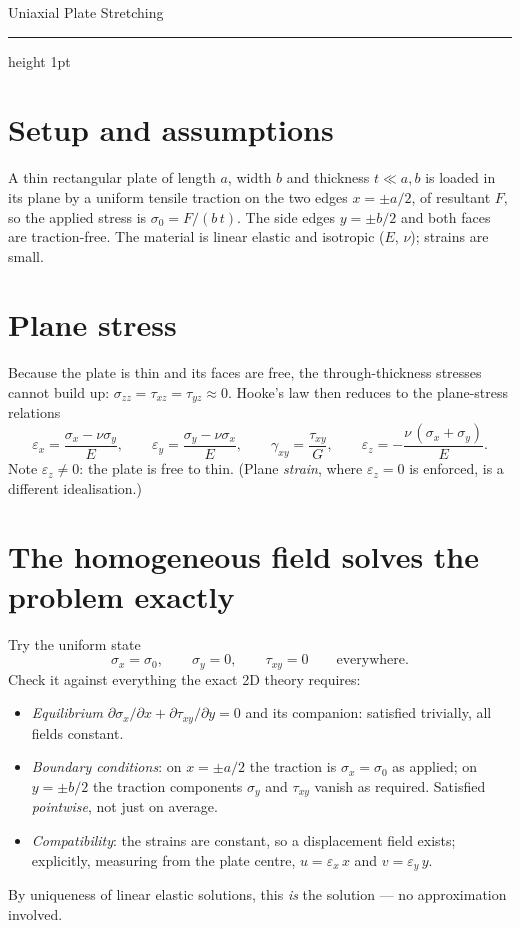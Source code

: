 \documentclass[10pt,a4paper]{article}
\begin{document}
{\LARGE Uniaxial Plate Stretching}

\medskip
{\color{celline}\hrule height 1pt}

\section*{Setup and assumptions}
A thin rectangular plate of length $a$, width $b$ and thickness $t \ll a, b$ is
loaded in its plane by a uniform tensile traction on the two edges
$x = \pm a/2$, of resultant $F$, so the applied stress is
$\sigma_0 = F/(b\,t)$. The side edges $y = \pm b/2$ and both faces are
traction-free. The material is linear elastic and isotropic ($E$, $\nu$);
strains are small.

\section*{Plane stress}
Because the plate is thin and its faces are free, the through-thickness stresses
cannot build up: $\sigma_{zz} = \tau_{xz} = \tau_{yz} \approx 0$. Hooke's law
then reduces to the plane-stress relations
\begin{equation}
\varepsilon_x = \frac{\sigma_x - \nu \sigma_y}{E}, \qquad
\varepsilon_y = \frac{\sigma_y - \nu \sigma_x}{E}, \qquad
\gamma_{xy} = \frac{\tau_{xy}}{G}, \qquad
\varepsilon_z = -\frac{\nu\,(\sigma_x + \sigma_y)}{E}.
\end{equation}
Note $\varepsilon_z \neq 0$: the plate is free to thin. (Plane \emph{strain},
where $\varepsilon_z = 0$ is enforced, is a different idealisation.)

\section*{The homogeneous field solves the problem exactly}
Try the uniform state
\begin{equation}
\sigma_x = \sigma_0, \qquad \sigma_y = 0, \qquad \tau_{xy} = 0
\qquad \text{everywhere.}
\end{equation}
Check it against everything the exact 2D theory requires:
\begin{itemize}
\setlength\itemsep{2pt}
\item \emph{Equilibrium} $\partial\sigma_x/\partial x + \partial\tau_{xy}/\partial y = 0$
      and its companion: satisfied trivially, all fields constant.
\item \emph{Boundary conditions}: on $x = \pm a/2$ the traction is
      $\sigma_x = \sigma_0$ as applied; on $y = \pm b/2$ the traction components
      $\sigma_y$ and $\tau_{xy}$ vanish as required. Satisfied \emph{pointwise},
      not just on average.
\item \emph{Compatibility}: the strains are constant, so a displacement field
      exists; explicitly, measuring from the plate centre,
      $u = \varepsilon_x\, x$ and $v = \varepsilon_y\, y$.
\end{itemize}
By uniqueness of linear elastic solutions, this \emph{is} the solution --- no
approximation involved.
\end{document}
